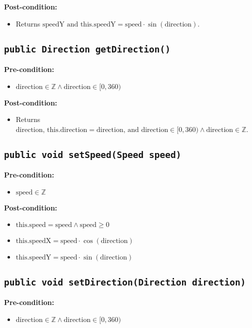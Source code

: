 \documentclass{article}
\begin{document}
\textbf{Post-condition:}
\begin{itemize}
    \item Returns \( \text{speedY} \text{ and this.speedY} = \text{speed} \cdot \sin(\text{direction}) \).
\end{itemize}


\subsection*{\texttt{public Direction getDirection()}}
\textbf{Pre-condition:}
\begin{itemize}
     \item \( \text{direction} \in \mathbb{Z} \wedge \text{direction} \in [0,360) \)
\end{itemize}

\textbf{Post-condition:}
\begin{itemize}
    \item Returns \( \text{direction} \text{, this.direction} = \text{direction, and direction} \in [0,360) \wedge \text{direction} \in \mathbb{Z} \).
\end{itemize}


\subsection*{\texttt{public void setSpeed(Speed speed)}}
\textbf{Pre-condition:}
\begin{itemize}
    \item \( \text{speed} \in \mathbb{Z} \)
\end{itemize}

\textbf{Post-condition:}
\begin{itemize}
    \item \( \text{this.speed} = \text{speed}  \wedge \text{speed} \geq 0 \)
    \item \( \text{this.speedX} = \text{speed} \cdot \cos(\text{direction}) \)
    \item \( \text{this.speedY} = \text{speed} \cdot \sin(\text{direction}) \)
\end{itemize}


\subsection*{\texttt{public void setDirection(Direction direction)}}
\textbf{Pre-condition:}
\begin{itemize}
     \item \( \text{direction} \in \mathbb{Z} \wedge \text{direction} \in [0,360) \)
\end{itemize}
\end{document}

